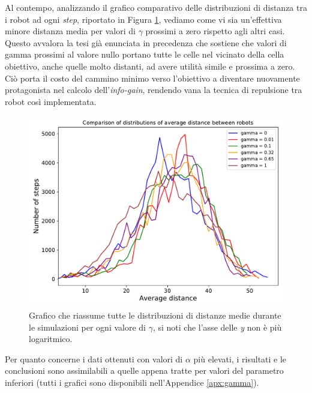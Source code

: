 Al contempo, analizzando il grafico comparativo delle distribuzioni di distanza tra i robot ad ogni \textit{step}, riportato in Figura \ref{fig:NgammaLComparison}, vediamo come vi sia un'effettiva minore distanza media per valori di $\gamma$ prossimi a zero rispetto agli altri casi. Questo avvalora la tesi già enunciata in precedenza che sostiene che valori di gamma prossimi al valore nullo portano tutte le celle nel vicinato della cella obiettivo, anche quelle molto distanti, ad avere utilità simile e prossima a zero. Ciò porta il costo del cammino minimo verso l'obiettivo a diventare nuovamente protagonista nel calcolo dell'\textit{info-gain}, rendendo vana la tecnica di repulsione tra robot così implementata.
\begin{figure}
	\centering
	\includegraphics[width=0.9\linewidth]{images/high_priority_gamma_results/low_alpha/comparison}
	\caption{Grafico che riassume tutte le distribuzioni di distanze medie durante le simulazioni per ogni valore di $\gamma$, si noti che l'asse delle \textit{y} non è più logaritmico.}
	\label{fig:NgammaLComparison}
\end{figure}
Per quanto concerne i dati ottenuti con valori di $\alpha$ più elevati, i risultati e le conclusioni sono assimilabili a quelle appena tratte per valori del parametro inferiori (tutti i grafici sono disponibili nell'Appendice \ref{apx:gamma}).
